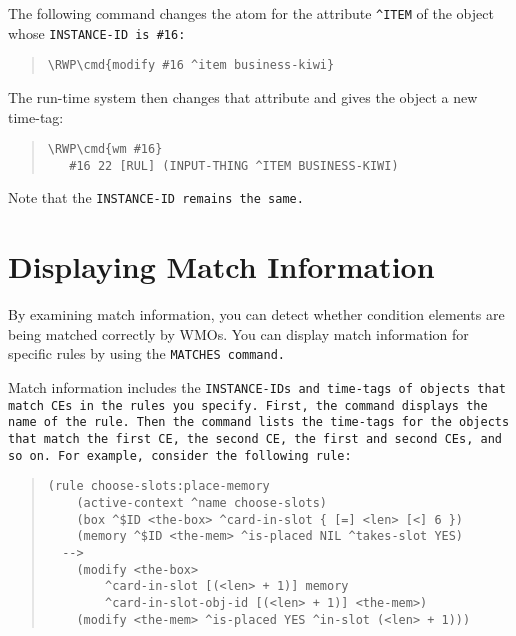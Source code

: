 The following command changes the atom for the attribute \verb|^ITEM|
of the object whose \tt{INSTANCE-ID} is \verb|#16|:

\begin{quote}
\begin{Verbatim}[commandchars=\\\{\}]
\RWP\cmd{modify #16 ^item business-kiwi}
\end{Verbatim}
\end{quote}

The run-time system then changes that attribute and gives the object a
new time-tag:

\begin{quote}
\begin{Verbatim}[commandchars=\\\{\}]
\RWP\cmd{wm #16}
   #16 22 [RUL] (INPUT-THING ^ITEM BUSINESS-KIWI)
\end{Verbatim}
\end{quote}

Note that the \tt{INSTANCE-ID} remains the same.

\section{Displaying Match Information}

By examining match information, you can detect whether condition
elements are being matched correctly by WMOs. You can display match
information for specific rules by using the \tt{MATCHES} command.

Match information includes the \tt{INSTANCE-ID}s and time-tags of
objects that match CEs in the rules you specify. First, the command
displays the name of the rule. Then the command lists the time-tags
for the objects that match the first CE, the second CE, the first and
second CEs, and so on. For example, consider the following rule:

\begin{quote}
\begin{verbatim}
(rule choose-slots:place-memory
    (active-context ^name choose-slots)
    (box ^$ID <the-box> ^card-in-slot { [=] <len> [<] 6 })
    (memory ^$ID <the-mem> ^is-placed NIL ^takes-slot YES)
  -->
    (modify <the-box>
        ^card-in-slot [(<len> + 1)] memory
        ^card-in-slot-obj-id [(<len> + 1)] <the-mem>)
    (modify <the-mem> ^is-placed YES ^in-slot (<len> + 1)))
\end{verbatim}
\end{quote}

